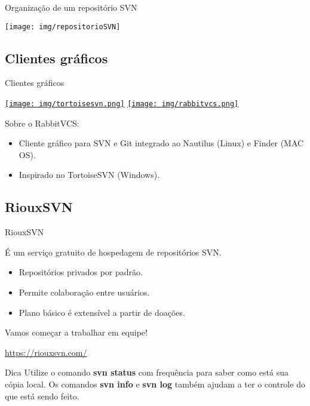 \documentclass[a4paper]{beamer}
\begin{document}
%

\begin{frame}{Organização de um repositório SVN}

\begin{center}
\texttt{[image: img/repositorioSVN]}
\end{center}

\end{frame}

\subsection{Clientes gráficos}

\begin{frame}{Clientes gráficos}

\begin{center}
\href{https://tortoisesvn.net/}{\texttt{[image: img/tortoisesvn.png]}}
\hspace{20pt}
\href{http://rabbitvcs.org/}{\texttt{[image: img/rabbitvcs.png]}}
\end{center}
\pause

\vspace{10pt}
Sobre o RabbitVCS:
\begin{itemize}
\item Cliente gráfico para SVN e Git integrado ao Nautilus (Linux) e Finder (MAC OS).
\item Inspirado no TortoiseSVN (Windows).
\end{itemize}

\end{frame}

\subsection{RiouxSVN}

\begin{frame}{RiouxSVN}

É um serviço gratuito de hospedagem de repositórios SVN.

\begin{itemize}
\item Repositórios privados por padrão.
\item Permite colaboração entre usuários.
\item Plano básico é extensível a partir de doações.
\end{itemize}

Vamos começar a trabalhar em equipe!
\begin{center}
\url{https://riouxsvn.com/}
\end{center}

\begin{block}{Dica}
Utilize o comando \textbf{svn status} com frequência para saber como está sua cópia local. Os comandos \textbf{svn info} e \textbf{svn log} também ajudam a ter o controle do que está sendo feito.
\end{block}

\end{frame}
\end{document}
